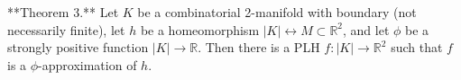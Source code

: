**Theorem 3.** Let $K$ be a combinatorial 2-manifold with boundary (not necessarily finite), let $h$ be a homeomorphism $|K| \leftrightarrow M \subset \mathbb{R}^2$, and let $\phi$ be a strongly positive function $|K| \rightarrow \mathbb{R}$. Then there is a PLH $f: |K| \rightarrow \mathbb{R}^2$ such that $f$ is a $\phi$-approximation of $h$.
